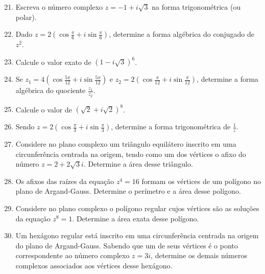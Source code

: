 \documentclass[12pt,a4paper]{article}
\begin{document}
\begin{enumerate}\setcounter{enumi}{20}
    \item Escreva o número complexo $z = -1 + i\sqrt{3}$ na forma trigonométrica (ou polar).

    \item Dado $z = 2 \left( \cos \frac{\pi}{6} + i \sin \frac{\pi}{6} \right)$, determine a forma algébrica do conjugado de $z^2$.

    \item Calcule o valor exato de $(1 - i\sqrt{3})^6$.

    \item Se $z_1 = 4 \left( \cos \frac{5\pi}{12} + i \sin \frac{5\pi}{12} \right)$ e $z_2 = 2 \left( \cos \frac{\pi}{12} + i \sin \frac{\pi}{12} \right)$, determine a forma algébrica do quociente $\frac{z_1}{z_2}$.

    \item Calcule o valor de $(\sqrt{2} + i\sqrt{2})^8$.

    \item Sendo $z = 2 \left( \cos \frac{\pi}{3} + i \sin \frac{\pi}{3} \right)$, determine a forma trigonométrica de $\frac{1}{z}$.
\end{enumerate}


\begin{enumerate}\setcounter{enumi}{26}
    \item Considere no plano complexo um triângulo equilátero inscrito em uma circunferência centrada na origem, tendo como um dos vértices o afixo do número $z = 2 + 2\sqrt{3}i$. Determine a área desse triângulo.

    \item Os afixos das raízes da equação $z^4 = 16$ formam os vértices de um polígono no plano de Argand-Gauss. Determine o perímetro e a área desse polígono.

    \item Considere no plano complexo o polígono regular cujos vértices são as soluções da equação $z^8 = 1$. Determine a área exata desse polígono.

    \item Um hexágono regular está inscrito em uma circunferência centrada na origem do plano de Argand-Gauss. Sabendo que um de seus vértices é o ponto correspondente ao número complexo $z = 3i$, determine os demais números complexos associados aos vértices desse hexágono.
\end{enumerate}
\end{document}
